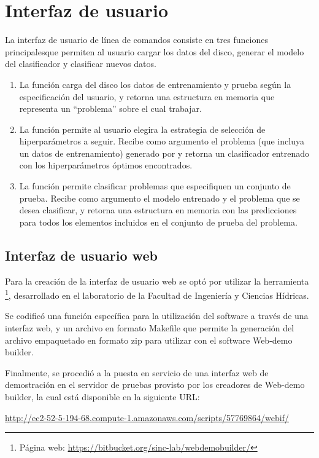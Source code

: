 \section{Interfaz de usuario}
La interfaz de usuario de línea de comandos consiste en
tres funciones principalesque permiten al usuario cargar los datos del disco,
generar el modelo del clasificador y clasificar nuevos datos.

\begin{enumerate}
\item La función  carga del disco los datos de
  entrenamiento y prueba según la especificación del usuario, y
  retorna una estructura en memoria que representa un ``problema''
  sobre el cual trabajar.
\item La función  permite al usuario elegira la
  estrategia de selección de hiperparámetros a seguir. Recibe como
  argumento el problema (que incluya un datos de entrenamiento)
  generado por  y retorna un clasificador entrenado
  con los hiperparámetros óptimos encontrados.
\item La función  permite clasificar problemas
  que especifiquen un conjunto de prueba.  Recibe como argumento el
  modelo entrenado y el problema que se desea clasificar, y retorna
  una estructura en memoria con las predicciones para todos los
  elementos incluidos en el conjunto de prueba del problema.
\end{enumerate}

\subsection{Interfaz de usuario web}
Para la creación de la interfaz de usuario web se optó por utilizar la
herramienta \footnote{Página web:
  \url{https://bitbucket.org/sinc-lab/webdemobuilder/}}, desarrollado
en el laboratorio  de la Facultad de Ingeniería y
Ciencias Hídricas.

Se codificó una función específica  para la utilización
del software a través de una interfaz web, y un archivo en formato
{\mono Makefile} que permite la generación del archivo empaquetado en
formato zip para utilizar con el software Web-demo builder.

Finalmente, se procedió a la puesta en servicio de una interfaz web de
demostración en el servidor de pruebas provisto por los creadores de
Web-demo builder, la cual está disponible en la siguiente URL:

\url{http://ec2-52-5-194-68.compute-1.amazonaws.com/scripts/57769864/webif/}